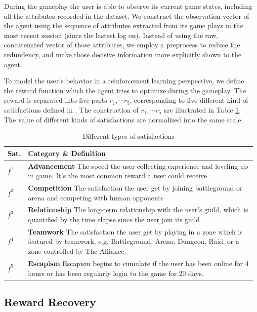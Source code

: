\documentclass{sigchi}
\begin{document}
During the gameplay the user is able to observe its current game states, including all the attributes recorded in the dataset. We construct the observation vector of the agent using the sequence of attributes extracted from its game plays in the most recent session (since the lastest log on). Instead of using the raw, concatenated vector of those attributes, we employ a preprocess to reduce the redundency, and make those decisive information more explicitly shown to the agent.

To model the user's behavior in a reinforcement learning perspective, we define the reward function which the agent tries to optimize during the gameplay. The reward is separated into five parts $r_1,\cdots r_5$, corresponding to five different kind of satisfactions defined in \cite{yee2006motivations}. The construction of $r_1,\cdots r_5$ are illustrated in Table \ref{tbl:satisfactions}. The value of different kinds of satisfactions are normalized into the same scale.

\begin{table}
\caption{Different types of satisfactions}
\begin{tabularx}{\textwidth}{lX}
    Sat. & \textbf{Category} \& Definition \\
    \midrule
    $f^1$ & \textbf{Advancement} The speed the user collecting experience and leveling up in game. It's the most common reward a user could receive \\
    $f^2$ & \textbf{Competition} The satisfaction the user get by joining battleground or arena and competing with human opponents \\
    $f^3$ & \textbf{Relationship} The long-term relationship with the user's guild, which is quantified by the time elapse since the user join its guild \\
    $f^4$ & \textbf{Teamwork} The satisfaction the user get by playing in a zone which is featured by teamwork, e.g. Battleground, Arena, Dungeon, Raid, or a zone controlled by The Alliance. \\
    $f^5$ & \textbf{Escapism} Escapism begins to cumulate if the user has been online for 4 hours or has been regularly login to the game for 20 days.
    \label{tbl:satisfactions}
\end{tabularx}
\end{table}


\subsection{Reward Recovery}
\end{document}
